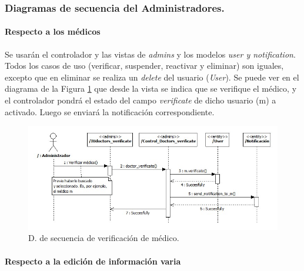 						


			\subsubsection{Diagramas de secuencia del Administradores.} %
			\label{par:diagramas_de_secuencia_del_administradores_}
			
			
				\paragraph{Respecto a los médicos} %
				\label{subp:cont_respecto_a_los_medicos}
				
					Se usarán el controlador y las vistas de \textit{admins} y los modelos \textit{user y notification}. Todos los casos de uso (verificar, suspender, reactivar y eliminar) son iguales, excepto que en eliminar se realiza un \textit{delete} del usuario (\textit{User}). Se puede ver en el diagrama de la Figura \ref{fig:cont_admin_verificate} que desde la vista se indica que se verifique el médico, y el controlador pondrá el estado del campo \textit{verificate} de dicho usuario (m) a activado. Luego se enviará la notificación correspondiente.
					
					\begin{figure}[H]
					  \centering
					    \includegraphics[width=15cm]{img/jpg/secuencia/16_admins_verificate.jpg}
					  \caption{D. de secuencia de verificación de médico.}
					  \label{fig:cont_admin_verificate}
					\end{figure}	
				
			
				\paragraph{Respecto a la edición de información varia} %
				\label{subp:cont_respecto_a_la_edicion_de_informacion_varia}
				
